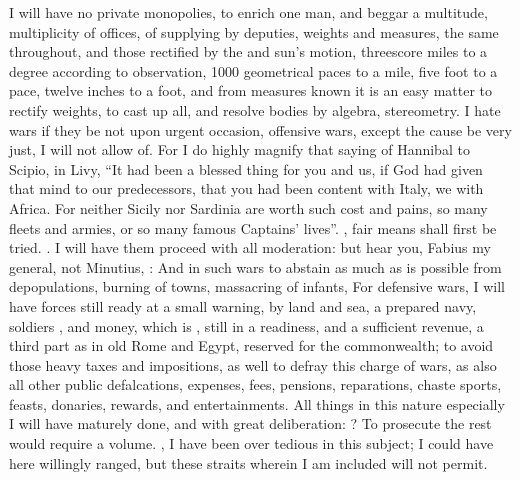 I will have no private monopolies, to enrich one man, and beggar a multitude,
multiplicity of offices, of supplying by deputies, weights
and measures, the same throughout, and those rectified by the  and sun's motion, threescore miles to a degree according to
observation, 1000 geometrical paces to a mile, five foot to a pace, twelve
inches to a foot, \etc{} and from measures known it is an easy matter to
rectify weights, \etc{} to cast up all, and resolve bodies by algebra,
stereometry. I hate wars if they be not  upon urgent
occasion,  offensive wars, except the cause be very just, I
will not allow of. For I do highly magnify that saying of Hannibal to Scipio,
in Livy, \enquote{It had been a blessed thing for you and us, if
God had given that mind to our predecessors, that you had been content with
Italy, we with Africa. For neither Sicily nor Sardinia are worth such cost and
pains, so many fleets and armies, or so many famous Captains' lives}. , fair means shall first be tried.
. I
will have them proceed with all moderation: but hear you, Fabius my general,
not Minutius, : And in such wars to abstain as
much as is possible from depopulations, burning of towns,
massacring of infants, \etc{} For defensive wars, I will have forces still
ready at a small warning, by land and sea, a prepared navy, soldiers , and money, which is , still in a readiness,
and a sufficient revenue, a third part as in old Rome and
Egypt, reserved for the commonwealth; to avoid those heavy taxes and
impositions, as well to defray this charge of wars, as also all other public
defalcations, expenses, fees, pensions, reparations, chaste sports, feasts,
donaries, rewards, and entertainments. All things in this nature especially I
will have maturely done, and with great deliberation:
? To prosecute the rest would require a volume. , I have been over tedious in this subject; I could have here willingly
ranged, but these straits wherein I am included will not permit.

